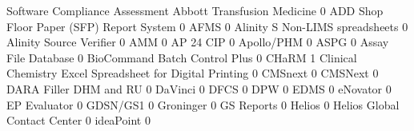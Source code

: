 \documentclass{article}
\begin{document}
\begin{Schunk}
\begin{Soutput}
                                                            Software Compliance Assessment
  Abbott Transfusion Medicine                                                            0
  ADD Shop Floor Paper (SFP) Report System                                               0
  AFMS                                                                                   0
  Alinity S Non-LIMS spreadsheets                                                        0
  Alinity Source Verifier                                                                0
  AMM                                                                                    0
  AP 24 CIP                                                                              0
  Apollo/PHM                                                                             0
  ASPG                                                                                   0
  Assay File Database                                                                    0
  BioCommand Batch Control Plus                                                          0
  CHaRM                                                                                  1
  Clinical Chemistry Excel Spreadsheet for Digital Printing                              0
  CMSnext                                                                                0
  CMSNext                                                                                0
  DARA Filler DHM and RU                                                                 0
  DaVinci                                                                                0
  DFCS                                                                                   0
  DPW                                                                                    0
  EDMS                                                                                   0
  eNovator                                                                               0
  EP Evaluator                                                                           0
  GDSN/GS1                                                                               0
  Groninger                                                                              0
  GS Reports                                                                             0
  Helios                                                                                 0
  Helios Global Contact Center                                                           0
  ideaPoint                                                                              0

\end{Soutput}
\end{Schunk}
\end{document}
